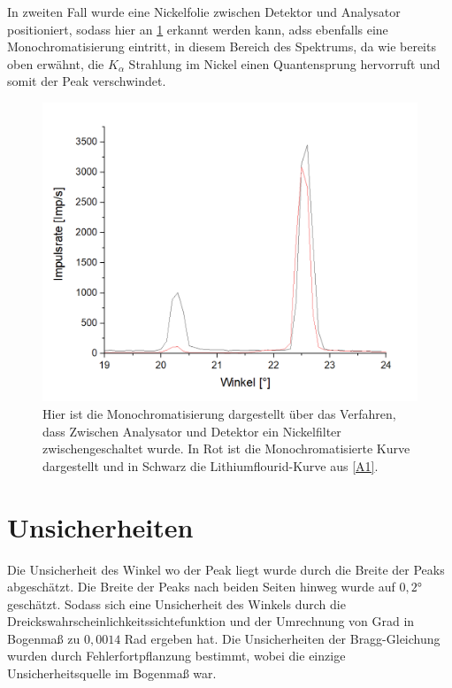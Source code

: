 \documentclass[
	a4paper,
	12pt,
	pagesize,
	ngerman
]{scrartcl}
\begin{document}
In zweiten Fall wurde eine Nickelfolie zwischen Detektor und Analysator positioniert, sodass hier an \cref{A7} erkannt werden kann, adss ebenfalls eine Monochromatisierung eintritt, in diesem Bereich des Spektrums, da wie bereits oben erwähnt, die $K_{\alpha}$ Strahlung im Nickel einen Quantensprung hervorruft und somit der Peak verschwindet.
\begin{figure}[h!]
    \centering
    \includegraphics[scale = 0.6]{abs-mono.png}
    \caption{Hier ist die Monochromatisierung dargestellt über das Verfahren, dass Zwischen Analysator und Detektor ein Nickelfilter zwischengeschaltet wurde. In Rot ist die Monochromatisierte Kurve dargestellt und in Schwarz die Lithiumflourid-Kurve aus \cref{A1}.}
    \label{A7}
\end{figure}

\section{Unsicherheiten}
Die Unsicherheit des Winkel wo der Peak liegt wurde durch die Breite der Peaks abgeschätzt. Die Breite der Peaks nach beiden Seiten hinweg wurde auf $0,2$° geschätzt. Sodass sich eine Unsicherheit des Winkels durch die Dreickswahrscheinlichkeitssichtefunktion und der Umrechnung von Grad in Bogenmaß zu $0,0014$ Rad ergeben hat.
Die Unsicherheiten der Bragg-Gleichung wurden durch Fehlerfortpflanzung bestimmt, wobei die einzige Unsicherheitsquelle im Bogenmaß war.
\end{document}

